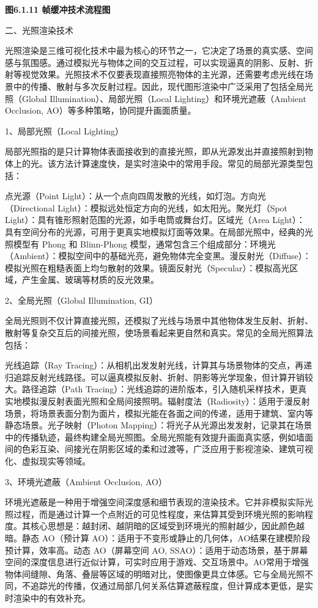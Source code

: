 \textbf{图6.1.11 帧缓冲技术流程图}

二、光照渲染技术

光照渲染是三维可视化技术中最为核心的环节之一，它决定了场景的真实感、空间感与氛围感。通过模拟光与物体之间的交互过程，可以实现逼真的阴影、反射、折射等视觉效果。光照技术不仅要表现直接照亮物体的主光源，还需要考虑光线在场景中的传播、散射与多次反射过程。因此，现代图形渲染中广泛采用了包括全局光照（Global Illumination）、局部光照（Local Lighting）和环境光遮蔽（Ambient Occlusion, AO）等多种策略，协同提升画面质量。

1、局部光照（Local Lighting）

局部光照指的是只计算物体表面接收到的直接光照，即从光源发出并直接照射到物体上的光。该方法计算速度快，是实时渲染中的常用手段。常见的局部光源类型包括：

点光源（Point Light）：从一个点向四周发散的光线，如灯泡。方向光（Directional Light）：模拟远处恒定方向的光线，如太阳光。聚光灯（Spot Light）：具有锥形照射范围的光源，如手电筒或舞台灯。区域光（Area Light）：具有空间分布的光源，可用于更真实地模拟灯面等效果。在局部光照中，经典的光照模型有 Phong 和 Blinn-Phong 模型，通常包含三个组成部分：环境光（Ambient）：模拟空间中的基础光亮，避免物体完全变黑。漫反射光（Diffuse）：模拟光照在粗糙表面上均匀散射的效果。镜面反射光（Specular）：模拟高光区域，产生金属、玻璃等材质的反光效果。

2、全局光照（Global Illumination, GI）

全局光照则不仅计算直接光照，还模拟了光线与场景中其他物体发生反射、折射、散射等复杂交互后的间接光照，使场景看起来更自然和真实。常见的全局光照算法包括：

光线追踪（Ray Tracing）：从相机出发发射光线，计算其与场景物体的交点，再递归追踪反射光线路径。可以逼真模拟反射、折射、阴影等光学现象，但计算开销较大。路径追踪（Path Tracing）：光线追踪的进阶版本，引入随机采样技术，更真实地模拟漫反射表面光照和全局间接照明。辐射度法（Radiosity）：适用于漫反射场景，将场景表面分割为面片，模拟光能在各面之间的传递，适用于建筑、室内等静态场景。光子映射（Photon Mapping）：将光子从光源出发发射，记录其在场景中的传播轨迹，最终构建全局光照图。全局光照能有效提升画面真实感，例如墙面间的色彩互染、间接光在阴影区域的柔和过渡等，广泛应用于影视渲染、建筑可视化、虚拟现实等领域。

3、环境光遮蔽（Ambient Occlusion, AO）

环境光遮蔽是一种用于增强空间深度感和细节表现的渲染技术。它并非模拟实际光照过程，而是通过计算一个点附近的可见性程度，来估算其受到环境光照的影响程度。其核心思想是：越封闭、越阴暗的区域受到环境光的照射越少，因此颜色越暗。静态 AO（预计算 AO）：适用于不变形或静止的几何体，AO结果在建模阶段预计算，效率高。动态 AO（屏幕空间 AO, SSAO）：适用于动态场景，基于屏幕空间的深度信息进行近似计算，可实时应用于游戏、交互场景中。AO常用于增强物体间缝隙、角落、叠层等区域的明暗对比，使图像更具立体感。它与全局光照不同，不追踪光的传播，仅通过局部几何关系估算遮蔽程度，但计算成本更低，是实时渲染中的有效补充。

